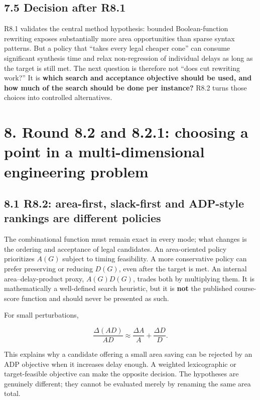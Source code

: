 \subsection{7.5 Decision after R8.1}\label{decision-after-r8.1}

R8.1 validates the central method hypothesis: bounded Boolean-function rewriting exposes substantially more area opportunities than sparse syntax patterns. But a policy that ``takes every legal cheaper cone'' can consume significant synthesis time and relax non-regression of individual delays as long as the target is still met. The next question is therefore not ``does cut rewriting work?'' It is \textbf{which search and acceptance objective should be used, and how much of the search should be done per instance?} R8.2 turns those choices into controlled alternatives.

\section{8. Round 8.2 and 8.2.1: choosing a point in a multi-dimensional engineering problem}\label{round-8.2-and-8.2.1-choosing-a-point-in-a-multi-dimensional-engineering-problem}

\subsection{8.1 R8.2: area-first, slack-first and ADP-style rankings are different policies}\label{r8.2-area-first-slack-first-and-adp-style-rankings-are-different-policies}

The combinational function must remain exact in every mode; what changes is the ordering and acceptance of legal candidates. An area-oriented policy prioritizes \(A(G)\) subject to timing feasibility. A more conservative policy can prefer preserving or reducing \(D(G)\), even after the target is met. An internal area--delay-product proxy, \(A(G)D(G)\), trades both by multiplying them. It is mathematically a well-defined search heuristic, but it is \textbf{not} the published course-score function and should never be presented as such.

For small perturbations,

\[
\frac{\Delta(AD)}{AD}\approx\frac{\Delta A}{A}+\frac{\Delta D}{D}.
\]

This explains why a candidate offering a small area saving can be rejected by an ADP objective when it increases delay enough. A weighted lexicographic or target-feasible objective can make the opposite decision. The hypotheses are genuinely different; they cannot be evaluated merely by renaming the same area total.

